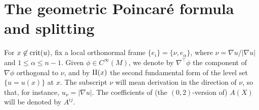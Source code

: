 \documentclass[10 pt,a4paper]{article}
\theoremstyle{definition}
\begin{document}


\section{The geometric Poincar\'e formula and splitting}\label{sec_poinc}
%
%
For $x \not \in {\rm crit}(u)$, fix a local orthonormal frame $\{e_i\} = \{\nu, e_\alpha\}$, where $\nu=\nabla u/|\nabla u|$ and $1 \le \alpha \le n-1$. Given $\phi \in C^\infty(M)$, we denote by  $\nabla^\top  \phi$ the component of $\nabla \phi$ orthogonal to $\nu$, and by $\operatorname{II}(x)$ the second fundamental form of the level set $\{u=u(x)\}$ at $x$. The subscript $\nu$ will mean derivation in the direction of $\nu$, so that, for instance, $u_\nu = |\nabla u|$. The coefficients of (the $(0,2)$-version of) $A(X)$ will be denoted by $A^{ij}$.
\end{document}
